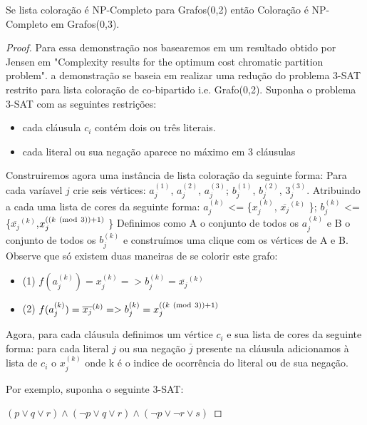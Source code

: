 \begin{corolario}
	Se lista coloração é NP-Completo para Grafos(0,2) então Coloração é NP-Completo em Grafos(0,3).
	\begin{proof}
		Para essa demonstração nos basearemos em um resultado obtido por Jensen em "Complexity results for the optimum cost chromatic partition problem". a demonstração se baseia em realizar uma redução do problema 3-SAT restrito para lista coloração de co-bipartido i.e. Grafo(0,2).
		Suponha o problema 3-SAT com as seguintes restrições:
		\begin{itemize}
			\item cada cláusula $c_i$ contém dois ou três literais.
			\item cada literal ou sua negação aparece no máximo em 3 cláusulas
		\end{itemize}
		Construiremos agora uma instância de lista coloração da seguinte forma:\newline
		Para cada varíavel $j$ crie seis vértices:
		$a_j^{(1)}$, $a_j^{(2)}$, $a_j^{(3)}$;
		$b_j^{(1)}$, $b_j^{(2)}$, $3_j^{(3)}$. Atribuindo a cada uma lista de cores da seguinte forma:\newline
		$a_j^{(k)}$ <= \{$x_j^{(k)}$, $\overline{x_j}^{(k)}$ \}; $b_j^{(k)}$ <= \{$\overline{x_j}^{(k)}$,$x_j^{((k \ (\mathrm{mod}\ 3)) + 1 )}$ \}\newline
		Definimos como A o conjunto de todos os $a_j^{(k)}$ e B o conjunto de todos os $b_j^{(k)}$ e construímos uma clique com os vértices de A e B. Observe que só existem duas maneiras de se colorir este grafo:
		\begin{itemize}
			\item (1)  $f(a_j^{(k)}) = x_j^{(k)} => b_j^{(k)} = \overline{x_j}^{(k)}$
			\item (2)  $f(a_j^{(k)}) = \overline{x_j}^{(k)} => b_j^{(k)} = x_j^{((k \ (\mathrm{mod}\ 3)) + 1 )}$
		\end{itemize}
		Agora, para cada cláusula definimos um vértice $c_i$ e sua lista de cores da seguinte forma: para cada literal $j$ ou sua negação $\overline{j}$ presente na cláusula adicionamos à lista de $c_i$ o $x_j^{(k)}$ onde k é o indice de ocorrência do literal ou de sua negação.
		
		Por exemplo, suponha o seguinte 3-SAT:
		
		$(p \lor q \lor r) \land (\neg{p} \lor q \lor r) \land (\neg{p} \lor \neg{r} \lor s)$
		

\end{proof}
\end{corolario}

